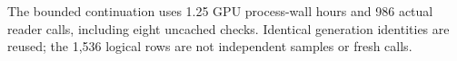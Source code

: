 The bounded continuation uses 1.25 GPU process-wall hours and 986 actual reader calls, including eight uncached checks. Identical generation identities are reused; the 1,536 logical rows are not independent samples or fresh calls.
